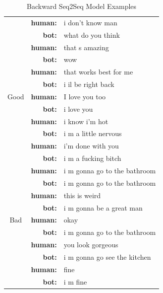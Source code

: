 \documentclass[letterpaper]{article}
\begin{document}
\begin{table}[bt!]
    \centering
    \small
    \caption{\small Backward Seq2Seq Model Examples}
    \begin{tabular}{c|rl}
    	\hline
      \hline
        & \textbf{human:} & i don't know man\\
		& \textbf{bot:} & what do you think\\		
& \textbf{human:} & that s amazing \\
& \textbf{bot:} & wow \\
& \textbf{human:} & that works best for me \\
& \textbf{bot:} & i il be right back \\
Good & \textbf{human:} & I love you too \\
& \textbf{bot:} & i love you \\
& \textbf{human:} & i know i'm hot \\
& \textbf{bot:} & i m a little nervous \\
& \textbf{human:} & i'm done with you \\
& \textbf{bot:} & i m a fucking bitch \\
\hline
& \textbf{human:} & i m gonna go to the bathroom\\
& \textbf{bot:} & i m gonna go to the bathroom \\
& \textbf{human:} & this is weird \\
& \textbf{bot:} & i m gonna be a great man \\
Bad & \textbf{human:} & okay\\
& \textbf{bot:} & i m gonna go to the bathroom\\
& \textbf{human:} & you look gorgeous \\
& \textbf{bot:} & i m gonna go see the kitchen \\
& \textbf{human:} & fine\\
& \textbf{bot:} & i m fine\\
      \hline
    \end{tabular}
    \label{table:backward_seq2seq}
\end{table}
\end{document}

